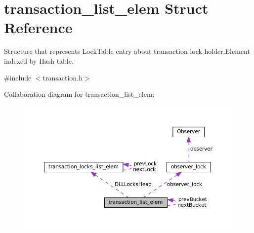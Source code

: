 \hypertarget{structtransaction__list__elem}{}\section{transaction\+\_\+list\+\_\+elem Struct Reference}
\label{structtransaction__list__elem}


Structure that represents Lock\+Table entry about transaction lock holder.\+Element indexed by Hash table.  




{\ttfamily \#include $<$transaction.\+h$>$}



Collaboration diagram for transaction\+\_\+list\+\_\+elem\+:\nopagebreak
\begin{figure}[H]
\begin{center}
\leavevmode
\includegraphics[width=350pt]{structtransaction__list__elem__coll__graph}
\end{center}
\end{figure}
